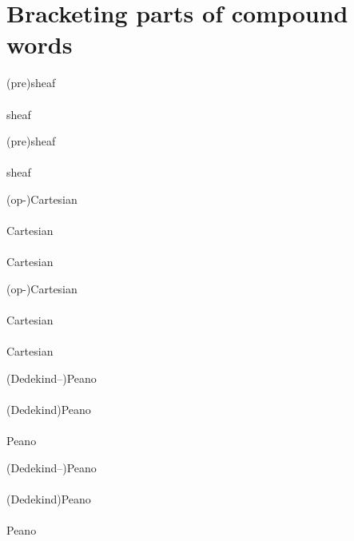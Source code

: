 \documentclass{article}
\begin{document}
\section{Bracketing parts of compound words}

\begin{verbatim*}
\begin{minipage}{0pt}
(pre)sheaf\\\\
sheaf\\
\end{minipage}
\end{verbatim*}
%
\begin{minipage}{0pt}
  (pre)sheaf\\\\
  sheaf\\
\end{minipage}

\begin{verbatim*}
\begin{minipage}{0pt}
(op-)Cartesian\\\\
Cartesian\\\\
Cartesian\\
\end{minipage}
\end{verbatim*}
%
\begin{minipage}{0pt}
  (op-)Cartesian\\\\
  Cartesian\\\\
  Cartesian\\
\end{minipage}

\begin{verbatim*}
\begin{minipage}{0pt}
(Dedekind--)Peano\\\\
(Dedekind\textendash{})Peano\\\\
Peano\\
\end{minipage}
\end{verbatim*}
%
\begin{minipage}{0pt}
  (Dedekind--)Peano\\\\
  (Dedekind\textendash{})Peano\\\\
  Peano\\
\end{minipage}
\end{document}
